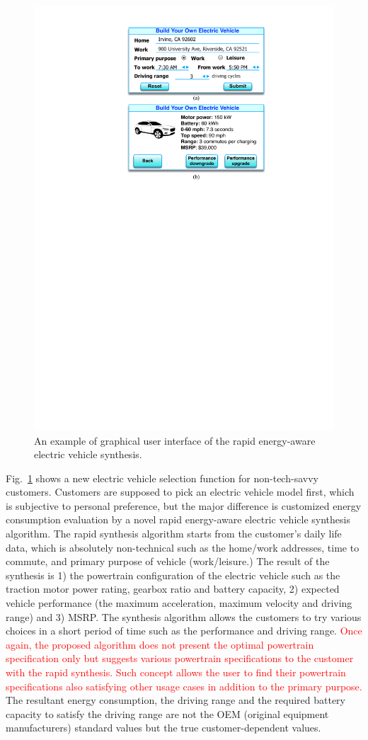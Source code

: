 \documentclass[journal]{IEEEtran}
\begin{document}
\begin{figure}
\centering
\includegraphics[width=0.7\hsize]{Figures/GUI.pdf}
\caption{An example of graphical user interface of the rapid energy-aware electric vehicle synthesis.}
\label{fig:GUI}
\end{figure}    

Fig.~\ref{fig:GUI} shows a new electric vehicle selection function for non-tech-savvy customers. Customers are supposed to pick an electric vehicle model first, which is subjective to personal preference, but the major difference is customized energy consumption evaluation by a novel rapid energy-aware electric vehicle synthesis algorithm. The rapid synthesis algorithm starts from the customer's daily life data, which is absolutely non-technical such as the home/work addresses, time to commute, and primary purpose of vehicle (work/leisure.) The result of the synthesis is 1) the powertrain configuration of the electric vehicle such as the traction motor power rating, gearbox ratio and battery capacity, 2) expected vehicle performance (the maximum acceleration, maximum velocity and driving range) and 3) MSRP. The synthesis algorithm allows the customers to try various choices in a short period of time such as the performance and driving range. 
\textcolor{red}{Once again, the proposed algorithm does not present the optimal powertrain specification only but suggests various powertrain specifications to the customer with the rapid synthesis. Such concept allows the user to find their powertrain specifications also satisfying other usage cases in addition to the primary purpose.}
The resultant energy consumption, the driving range and the required battery capacity to satisfy the driving range are not the OEM (original equipment manufacturers) standard values but the true customer-dependent values. 
\end{document}
